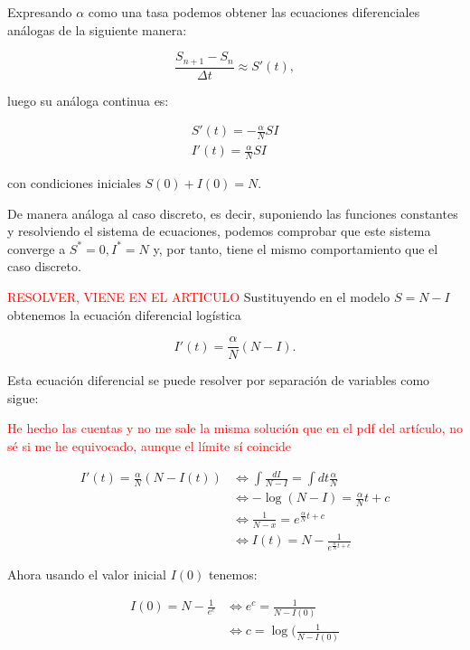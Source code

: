 Expresando $\alpha$ como una tasa podemos obtener las ecuaciones diferenciales análogas de la siguiente manera:

$$\frac{S_{n+1} - S_n}{\Delta t} \approx S'(t),$$

luego su análoga continua es:

\begin{equation}
\begin{aligned}
S'(t) = -\frac{\alpha}{N}SI \\
I'(t) = \frac{\alpha}{N}SI
\end{aligned}
\end{equation}

con condiciones iniciales $S(0)+I(0)=N$.

De manera análoga al caso discreto, es decir, suponiendo las funciones constantes y resolviendo el sistema de ecuaciones, podemos comprobar que este sistema converge a $S^*=0, I^*=N$ y, por tanto, tiene el mismo comportamiento que el caso discreto.

\textcolor{red}{RESOLVER, VIENE EN EL ARTICULO}
Sustituyendo en el modelo $S=N-I$ obtenemos la ecuación diferencial logística

$$I'(t) = \frac{\alpha}{N}(N-I).$$

Esta ecuación diferencial se puede resolver por separación de variables como sigue:

\textcolor{red}{He hecho las cuentas y no me sale la misma solución que en el pdf del artículo, no sé si me he equivocado, aunque el límite sí coincide}

\begin{equation}
\begin{aligned}
I'(t)=\frac{\alpha}{N}(N-I(t)) & \Leftrightarrow \int \frac{dI}{N-I} = \int dt \frac{\alpha}{N} \\
& \Leftrightarrow -\log(N-I) = \frac{\alpha}{N}t+c \\
& \Leftrightarrow  \frac{1}{N-x} = e^{\frac{\alpha}{N}t+c} \\
& \Leftrightarrow  I(t) = N-\frac{1}{e^{\frac{\alpha}{N}t+c}}
\end{aligned}
\end{equation}

Ahora usando el valor inicial $I(0)$ tenemos:

\begin{equation}
\begin{aligned}
I(0) = N-\frac{1}{e^c} & \Leftrightarrow e^c = \frac{1}{N-I(0)} \\
& \Leftrightarrow c=\log(\frac{1}{N-I(0)}
\end {aligned}
\end{equation}

